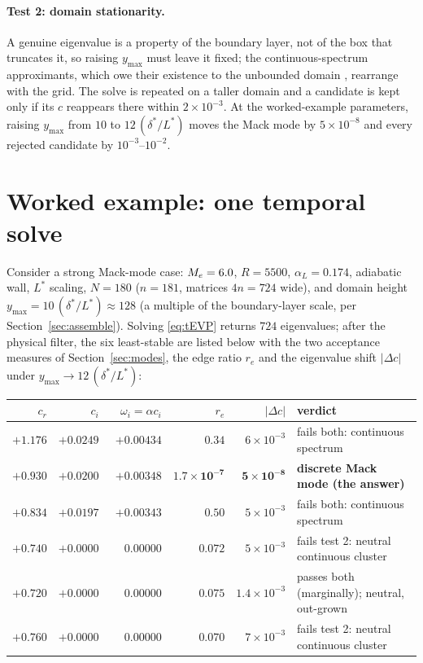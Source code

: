 \documentclass[11pt]{article}
\begin{document}
\paragraph{Test 2: domain stationarity.} A genuine eigenvalue is a property of the boundary
layer, not of the box that truncates it, so raising $y_{\max}$ must leave it fixed; the
continuous-spectrum approximants, which owe their existence to the unbounded domain
\cite{grosch1978}, rearrange with the grid. The solve is repeated on a taller domain and a candidate
is kept only if its $c$ reappears there within $2\times10^{-3}$.
At the worked-example parameters, raising $y_{\max}$ from $10$ to $12\,(\delta^*/L^*)$ moves the
Mack mode by $5\times10^{-8}$ and every rejected candidate by $10^{-3}$--$10^{-2}$.

\section{Worked example: one temporal solve}\label{sec:worked}
Consider a strong Mack-mode case: $M_e=6.0$, $R=5500$, $\alpha_L=0.174$, adiabatic wall, $L^*$
scaling, $N=180$ ($n=181$, matrices $4n=724$ wide), and domain height
$y_{\max}=10\,(\delta^*/L^*)\approx128$ (a multiple of the boundary-layer scale, per
Section~\ref{sec:assemble}). Solving \eqref{eq:tEVP} returns $724$ eigenvalues; after the physical
filter, the six least-stable are listed below with the two acceptance measures of
Section~\ref{sec:modes}, the edge ratio $r_e$ and the eigenvalue shift $|\Delta c|$ under
$y_{\max}\to12\,(\delta^*/L^*)$:
\begin{center}\small
\begin{tabular}{@{}rrrrrl@{}}
\toprule
$c_r$ & $c_i$ & $\omega_i=\alpha c_i$ & $r_e$ & $|\Delta c|$ & verdict \\
\midrule
$+1.176$ & $+0.0249$ & $+0.00434$ & $0.34$ & $6\times10^{-3}$ & fails both: continuous spectrum \\
$\mathbf{+0.930}$ & $\mathbf{+0.0200}$ & $\mathbf{+0.00348}$ & $\mathbf{1.7\times10^{-7}}$ &
  $\mathbf{5\times10^{-8}}$ & \textbf{discrete Mack mode (the answer)} \\
$+0.834$ & $+0.0197$ & $+0.00343$ & $0.50$ & $5\times10^{-3}$ & fails both: continuous spectrum \\
$+0.740$ & $+0.0000$ & $\phantom{+}0.00000$ & $0.072$ & $5\times10^{-3}$ & fails test 2: neutral
  continuous cluster \\
$+0.720$ & $+0.0000$ & $\phantom{+}0.00000$ & $0.075$ & $1.4\times10^{-3}$ & passes both
  (marginally); neutral, out-grown \\
$+0.760$ & $+0.0000$ & $\phantom{+}0.00000$ & $0.070$ & $7\times10^{-3}$ & fails test 2: neutral
  continuous cluster \\
\bottomrule
\end{tabular}
\end{center}
\end{document}
